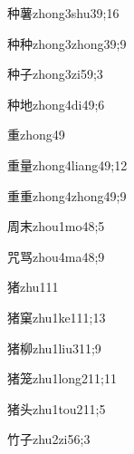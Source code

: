 \begin{verbete}{种薯}{zhong3shu3}{9;16}
\end{verbete}
\begin{verbete}{种种}{zhong3zhong3}{9;9}
\end{verbete}
\begin{verbete}{种子}{zhong3zi5}{9;3}
\end{verbete}
\begin{verbete}{种地}{zhong4di4}{9;6}
\end{verbete}
\begin{verbete}{重}{zhong4}{9}
\end{verbete}
\begin{verbete}{重量}{zhong4liang4}{9;12}
\end{verbete}
\begin{verbete}{重重}{zhong4zhong4}{9;9}
\end{verbete}
\begin{verbete}{周末}{zhou1mo4}{8;5}
\end{verbete}
\begin{verbete}{咒骂}{zhou4ma4}{8;9}
\end{verbete}
\begin{verbete}{猪}{zhu1}{11}
\end{verbete}
\begin{verbete}{猪窠}{zhu1ke1}{11;13}
\end{verbete}
\begin{verbete}{猪柳}{zhu1liu3}{11;9}
\end{verbete}
\begin{verbete}{猪笼}{zhu1long2}{11;11}
\end{verbete}
\begin{verbete}{猪头}{zhu1tou2}{11;5}
\end{verbete}
\begin{verbete}{竹子}{zhu2zi5}{6;3}
\end{verbete}
